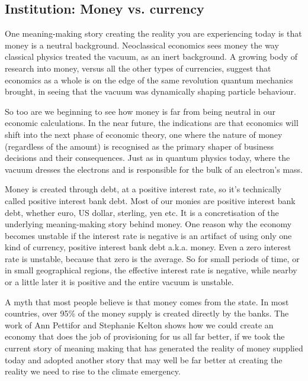 \subsection{Institution: Money vs. currency}
\label{section:money-vs-currency}


One meaning\hyp{}making story creating the reality you are experiencing today is that money is a neutral background. Neoclassical economics sees money the way classical physics treated the vacuum, as an inert background. A growing body of research into money\cite{leander-phd,lietaer-money-and-sustainability,lietaer-rethinking}, versus all the other types of currencies, suggest that economics as a whole is on the edge of the same revolution quantum mechanics brought, in seeing that the vacuum was dynamically shaping particle behaviour. 


So too are we beginning to see how money is far from being neutral in our economic calculations. In the near future, the indications are that economics will shift into the next phase of economic theory, one where the nature of money (regardless of the amount) is recognised as the primary shaper of business decisions and their consequences. Just as in quantum physics today, where the vacuum dresses the electrons and is responsible for the bulk of an electron’s mass.


Money is created through debt, at a positive interest rate, so it's technically called positive interest bank debt. Most of our monies are positive interest bank debt, whether euro, US dollar, sterling, yen etc. It is a concretisation of the underlying meaning\hyp{}making story behind money. One reason why the economy becomes unstable if the interest rate is negative is an artifact of using only one kind of currency, positive interest bank debt a.k.a. money. Even a zero interest rate is unstable, because that zero is the average. So for small periods of time, or in small geographical regions, the effective interest rate is negative, while nearby or a little later it is positive and the entire vacuum is unstable.


A myth that most people believe is that money comes from the state. In most countries, over 95\% of the money supply is created directly by the banks. The work of Ann Pettifor\cite{pettifor-production-of-money} and Stephanie Kelton\cite{kelton-deficit}  shows how we could create an economy that does the job of provisioning for us all far better, if we took the current story of meaning making that has generated the reality of money supplied today and adopted another story that may well be far better at creating the reality we need to rise to the climate emergency.


